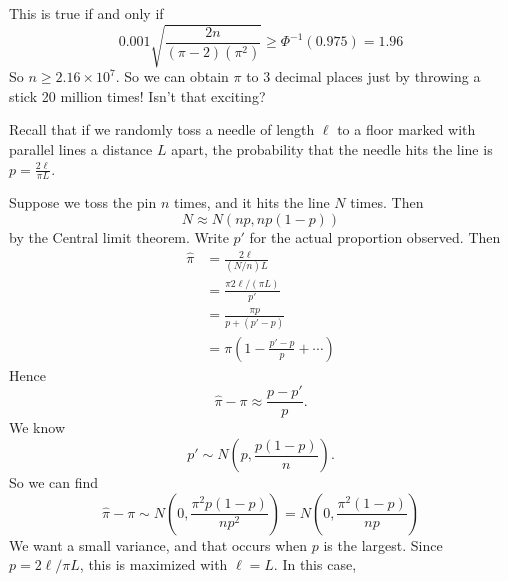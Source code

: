 \begin{note}
\begin{field}
\begin{eg}
\[      \]
      This is true if and only if
      \[
        0.001\sqrt{\frac{2n}{(\pi - 2)(\pi^2)}} \geq \Phi^{-1}(0.975) = 1.96
      \]
      So $n\geq 2.16 \times 10^7$. So we can obtain $\pi$ to 3 decimal places just by throwing a stick 20 million times! Isn't that exciting?
    \end{eg}
  \end{field}
  \begin{field}
    \begin{eg}
      Recall that if we randomly toss a needle of length $\ell$ to a floor marked with parallel lines a distance $L$ apart, the probability that the needle hits the line is $p = \frac{2\ell}{\pi L}$.
      \begin{center}
      \end{center}
      Suppose we toss the pin $n$ times, and it hits the line $N$ times. Then
      \[
        N\approx N(np, np(1 - p))
      \]
      by the Central limit theorem. Write $p'$ for the actual proportion observed. Then
      \begin{align*}
        \hat{\pi} &= \frac{2\ell}{(N/n) L} \\
        &= \frac{\pi 2\ell/(\pi L)}{p'}\\
        &= \frac{\pi p}{p + (p' - p)}\\
        &= \pi \left(1 - \frac{p' - p}{p} + \cdots \right)
      \end{align*}
      Hence
      \[
        \hat\pi - \pi \approx \frac{p - p'}{p}.
      \]
      We know
      \[
        p' \sim N\left(p, \frac{p(1 - p)}{n}\right).
      \]
      So we can find
      \[
        \hat \pi - \pi \sim N\left(0, \frac{\pi^2 p(1 - p)}{np^2}\right) = N\left(0, \frac{\pi^2(1 - p)}{np}\right)
      \]
      We want a small variance, and that occurs when $p$ is the largest. Since $p = 2\ell/\pi L$, this is maximized with $\ell = L$. In this case,

\end{eg}
\end{field}
\end{note}
